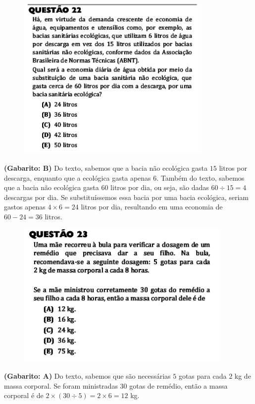 \documentclass[a4paper]{article}
\begin{document}
\begin{figure}[H]
	\begin{center}
		\includegraphics[width=9.5cm]{L2Q22.png}
	\end{center}
\end{figure}
\par\textbf{(Gabarito: B)} Do texto, sabemos que a bacia não ecológica gasta $15$ litros por descarga, enquanto que a ecológica gasta apenas $6$. Também do texto, sabemos que a bacia não ecológica gasta $60$ litros por dia, ou seja, são dadas $60\div15 = 4$ descargas por dia. Se substituíssemos essa bacia por uma bacia ecológica, seriam gastos apenas $4\times 6 = 24$ litros por dia, resultando em uma economia de $60-24=36$ litros.
\begin{figure}[H]
	\begin{center}
		\includegraphics[width=10.5cm]{L2Q23.png}
	\end{center}
\end{figure}
\par\textbf{(Gabarito: A)} Do texto, sabemos que são necessárias $5$ gotas para cada $2$ kg de massa corporal. Se foram ministradas $30$ gotas de remédio, então a massa corporal é de $2\times(30\div5) = 2\times 6 = 12$ kg.
\end{document}
